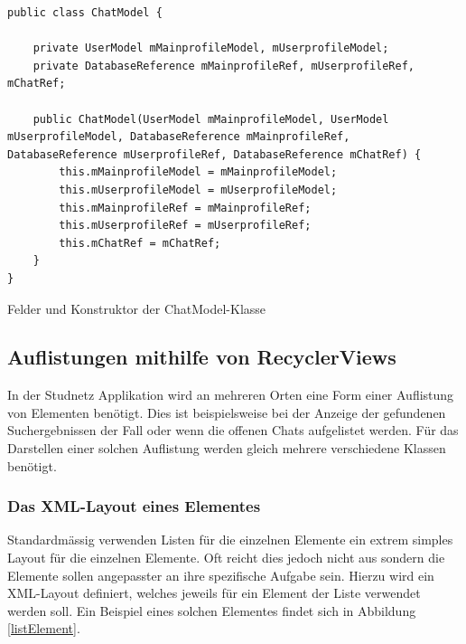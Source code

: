 \documentclass[../main.tex]{subfiles}
\begin{document}
\begin{code}
	\begin{center}
		\begin{verbatim}
public class ChatModel {

	private UserModel mMainprofileModel, mUserprofileModel;
	private DatabaseReference mMainprofileRef, mUserprofileRef, mChatRef;

	public ChatModel(UserModel mMainprofileModel, UserModel mUserprofileModel, DatabaseReference mMainprofileRef, DatabaseReference mUserprofileRef, DatabaseReference mChatRef) {
		this.mMainprofileModel = mMainprofileModel;
		this.mUserprofileModel = mUserprofileModel;
		this.mMainprofileRef = mMainprofileRef;
		this.mUserprofileRef = mUserprofileRef;
		this.mChatRef = mChatRef;
	}
}

		\end{verbatim}
		\caption{Felder und Konstruktor der ChatModel-Klasse}
		\label{chatModelConst}
	\end{center}
	
\end{code}
		
	\subsection{Auflistungen mithilfe von RecyclerViews}
	In der Studnetz Applikation wird an mehreren Orten eine Form einer Auflistung von Elementen benötigt. Dies ist beispielsweise bei der Anzeige der gefundenen Suchergebnissen der Fall oder wenn die offenen Chats aufgelistet werden. Für das Darstellen einer solchen Auflistung werden gleich mehrere verschiedene Klassen benötigt.
	
	\subsubsection{Das XML-Layout eines Elementes}
	Standardmässig verwenden Listen für die einzelnen Elemente ein extrem simples Layout für die einzelnen Elemente. Oft reicht dies jedoch nicht aus sondern die Elemente sollen angepasster an ihre spezifische Aufgabe sein. Hierzu wird ein XML-Layout definiert, welches jeweils für ein Element der Liste verwendet werden soll. Ein Beispiel eines solchen Elementes findet sich in Abbildung \ref{listElement}.
	
\end{document}
